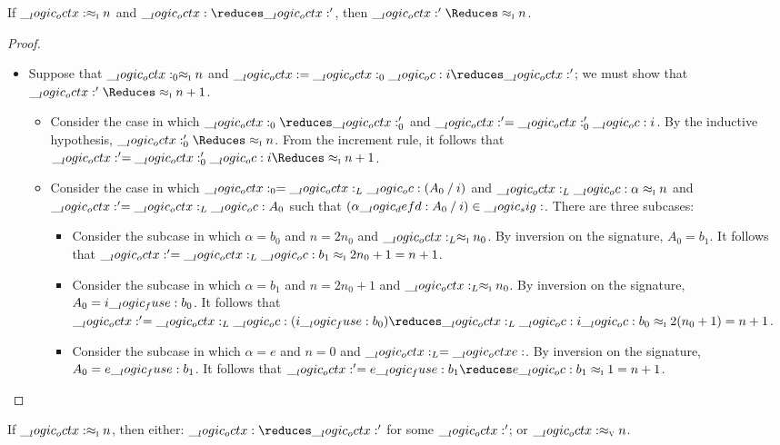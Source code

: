 \begin{theorem}[Preservation]
  If \(\__logic_octx: \approx\sb{\text{\normalfont\scshape i}} n\) and \(\octx \reduces \octx'\), then \(\octx' \Reduces \ainc{}{n}\).
\end{theorem}
%
\begin{proof}
  \begin{itemize}
  \item Suppose that \(\__logic_octx:_0 \approx\sb{\text{\normalfont\scshape i}} n\) and \(\octx = \octx_0 \oc i \reduces \octx'\); we must show that \(\octx' \Reduces \ainc{}{n+1}\).
    \begin{itemize}
    \item Consider the case in which \(\octx_0 \reduces \octx'_0\) and \(\__logic_octx:' = \__logic_octx:'_0 \__logic_oc: i\).
      By the inductive hypothesis, \(\octx'_0 \Reduces \ainc{}{n}\).
      From the increment rule, it follows that \(\octx' = \octx'_0 \oc i \Reduces \ainc{}{n+1}\).
    \item Consider the case in which \(\__logic_octx:_0 = \__logic_octx:_L \__logic_oc: (A_0 \mathbin { / } i)\) and \(\__logic_octx:_L \__logic_oc: \alpha \approx\sb{\text{\normalfont\scshape i}} n\) and \(\__logic_octx:' = \__logic_octx:_L \__logic_oc: A_0\) such that \((\alpha \__logic_defd: A_0 \mathbin { / } i) \in \__logic_sig:\).
      There are three subcases:
      \begin{itemize}
      \item Consider the subcase in which \(\alpha = b_0\) and \(n = 2n_0\) and \(\__logic_octx:_L \approx\sb{\text{\normalfont\scshape i}} n_0\).
        By inversion on the signature, \(A_0 = b_1\).
        It follows that \(\__logic_octx:' = \__logic_octx:_L \__logic_oc: b_1 \approx\sb{\text{\normalfont\scshape i}} 2n_0+1 = n+1\).
      \item Consider the subcase in which \(\alpha = b_1\) and \(n = 2n_0+1\) and \(\__logic_octx:_L \approx\sb{\text{\normalfont\scshape i}} n_0\).
        By inversion on the signature, \(A_0 = i \__logic_fuse: b_0\).
        It follows that \(\octx' = \octx_L \oc (i \fuse b_0) \reduces \ainc{\octx_L \oc i \oc b_0}{2(n_0+1)} = n+1\).
      \item Consider the subcase in which \(\alpha = e\) and \(n = 0\) and \(\__logic_octx:_L = \__logic_octxe:\).
        By inversion on the signature, \(A_0 = e \__logic_fuse: b_1\).
        It follows that \(\octx' = e \fuse b_1 \reduces \ainc{e \oc b_1}{1} = n+1\).
      \end{itemize}
    \end{itemize}
  \end{itemize}
\end{proof}

\begin{theorem}[Progress]
  If \(\__logic_octx: \approx\sb{\text{\normalfont\scshape i}} n\), then either: \(\octx \reduces \octx'\) for some \(\__logic_octx:'\); or \(\__logic_octx: \approx\sb{\text{\normalfont\scshape v}} n\).
\end{theorem}



